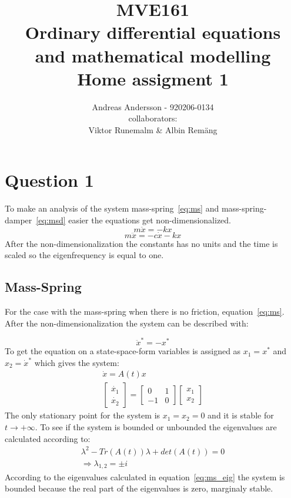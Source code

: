 \documentclass[
  twoside,
  11pt, a4paper,
  footinclude=true,
  headinclude=true,
  cleardoublepage=empty
]{scrbook}
\title{\Large MVE161\\ \small Ordinary differential equations\\ and mathematical modelling\\ \Huge Home assigment 1}
\author{Andreas Andersson - 920206-0134\\ collaborators: \\Viktor Runemalm \& Albin Remäng}
\begin{document}
\maketitle

\chapter{Question 1}
To make an analysis of the system mass-spring~\eqref{eq:ms} and mass-spring-damper~\eqref{eq:msd} easier the equations get non-dimensionalized.
\begin{equation}\label{eq:ms}
	m \ddot{x} = -k x
\end{equation}
\begin{equation}\label{eq:msd}
	m \ddot{x} = -c \dot{x} -k x
\end{equation}
After the non-dimensionalization the constants has no units and the time is scaled so the eigenfrequency is equal to one. 

\section{Mass-Spring}
For the case with the mass-spring when there is no friction, equation~\eqref{eq:ms}. After the non-dimensionalization the system can be described with:

\begin{equation}
	\ddot{x}^*=-x^*
\end{equation}
To get the equation on a state-space-form variables is assigned as $x_1=x^*$ and $x_2=\dot{x}^*$ which gives the system:
\begin{equation}
	\begin{gathered}
		\dot{x}=A(t)x\\
		\begin{bmatrix}
			\dot{x_1}\\
			\dot{x_2}
		\end{bmatrix}=\begin{bmatrix}
			0	&	1\\
			-1	&	0
		\end{bmatrix}\begin{bmatrix}
			x_1\\
			x_2
		\end{bmatrix}
	\end{gathered}
\end{equation}
The only stationary point for the system is $x_1=x_2=0$ and it is stable for $t\rightarrow+\infty$. To see if the system is bounded or unbounded the eigenvalues are calculated according to:
\begin{equation}\label{eq:ms_eig}
	\begin{gathered}
		\lambda^2-Tr(A(t))\lambda+det(A(t))=0\\
		\Rightarrow \lambda_{1,2}=\pm i
	\end{gathered}
\end{equation}
According to the eigenvalues calculated in equation~\eqref{eq:ms_eig} the system is bounded because the real part of the eigenvalues is zero, marginaly stable.
\end{document}
